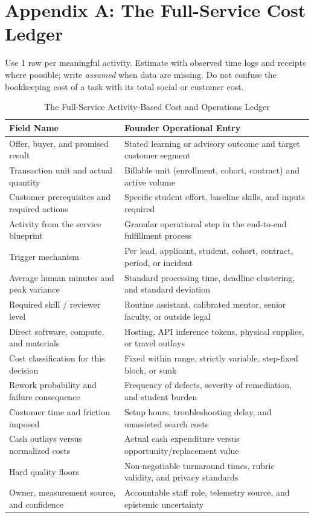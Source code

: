 \section*{Appendix A: The Full-Service Cost Ledger}

Use 1 row per meaningful activity. Estimate with observed time logs and receipts where possible; write \emph{assumed} when data are missing. Do not confuse the bookkeeping cost of a task with its total social or customer cost.

\begin{table}[t]
\centering
\small
\caption{The Full-Service Activity-Based Cost and Operations Ledger}
\begin{tabularx}{\textwidth}{p{}X}
\toprule
\textbf{Field Name} & \textbf{Founder Operational Entry} \\
\midrule
Offer, buyer, and promised result & Stated learning or advisory outcome and target customer segment \\
Transaction unit and actual quantity & Billable unit (enrollment, cohort, contract) and active volume \\
Customer prerequisites and required actions & Specific student effort, baseline skills, and inputs required \\
Activity from the service blueprint & Granular operational step in the end-to-end fulfillment process \\
Trigger mechanism & Per lead, applicant, student, cohort, contract, period, or incident \\
Average human minutes and peak variance & Standard processing time, deadline clustering, and standard deviation \\
Required skill / reviewer level & Routine assistant, calibrated mentor, senior faculty, or outside legal \\
Direct software, compute, and materials & Hosting, API inference tokens, physical supplies, or travel outlays \\
Cost classification for this decision & Fixed within range, strictly variable, step-fixed block, or sunk \\
Rework probability and failure consequence & Frequency of defects, severity of remediation, and student burden \\
Customer time and friction imposed & Setup hours, troubleshooting delay, and unassisted search costs \\
Cash outlays versus normalized costs & Actual cash expenditure versus opportunity/replacement value \\
Hard quality floors & Non-negotiable turnaround times, rubric validity, and privacy standards \\
Owner, measurement source, and confidence & Accountable staff role, telemetry source, and epistemic uncertainty \\
\bottomrule
\end{tabularx}
\end{table}

